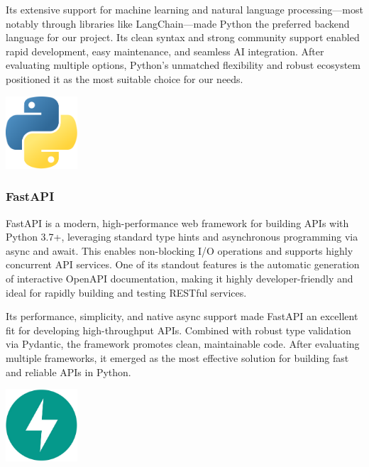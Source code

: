 Its extensive support for machine learning and natural language processing—most notably through libraries like LangChain—made Python the preferred backend language for our project. Its clean syntax and strong community support enabled rapid development, easy maintenance, and seamless AI integration. After evaluating multiple options, Python’s unmatched flexibility and robust ecosystem positioned it as the most suitable choice for our needs.

\begin{center}
    \centering
    \includegraphics[width=0.2\textwidth]{Images/Python Logo.png}
     \cite{python_logo}
    \label{fig:python_logo}
\end{center}

\subsubsection{FastAPI}
FastAPI is a modern, high-performance web framework for building APIs with Python 3.7+, leveraging standard type hints and asynchronous programming via async and await. This enables non-blocking I/O operations and supports highly concurrent API services. One of its standout features is the automatic generation of interactive OpenAPI documentation, making it highly developer-friendly and ideal for rapidly building and testing RESTful services.\mynewline

Its performance, simplicity, and native async support made FastAPI an excellent fit for developing high-throughput APIs. Combined with robust type validation via Pydantic, the framework promotes clean, maintainable code. After evaluating multiple frameworks, it emerged as the most effective solution for building fast and reliable APIs in Python.

\begin{center}
    \centering
    \includegraphics[width=0.2\textwidth]{Images/FastAPI Logo.jpg}
     \cite{fastapi_logo}
    \label{fig:fastapi_logo}
\end{center}

